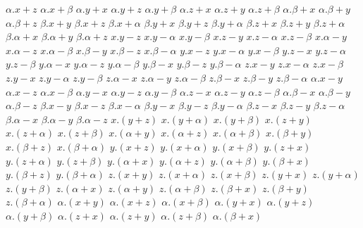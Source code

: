 $ \alpha . x + z $
$ \alpha . x + \beta $
$ \alpha . y + x $
$ \alpha . y + z $
$ \alpha . y + \beta $
$ \alpha . z + x $
$ \alpha . z + y $
$ \alpha . z + \beta $
$ \alpha . \beta + x $
$ \alpha . \beta + y $
$ \alpha . \beta + z $
$ \beta . x + y $
$ \beta . x + z $
$ \beta . x + \alpha $
$ \beta . y + x $
$ \beta . y + z $
$ \beta . y + \alpha $
$ \beta . z + x $
$ \beta . z + y $
$ \beta . z + \alpha $
$ \beta . \alpha + x $
$ \beta . \alpha + y $
$ \beta . \alpha + z $
$ x . y - z $
$ x . y - \alpha $
$ x . y - \beta $
$ x . z - y $
$ x . z - \alpha $
$ x . z - \beta $
$ x . \alpha - y $
$ x . \alpha - z $
$ x . \alpha - \beta $
$ x . \beta - y $
$ x . \beta - z $
$ x . \beta - \alpha $
$ y . x - z $
$ y . x - \alpha $
$ y . x - \beta $
$ y . z - x $
$ y . z - \alpha $
$ y . z - \beta $
$ y . \alpha - x $
$ y . \alpha - z $
$ y . \alpha - \beta $
$ y . \beta - x $
$ y . \beta - z $
$ y . \beta - \alpha $
$ z . x - y $
$ z . x - \alpha $
$ z . x - \beta $
$ z . y - x $
$ z . y - \alpha $
$ z . y - \beta $
$ z . \alpha - x $
$ z . \alpha - y $
$ z . \alpha - \beta $
$ z . \beta - x $
$ z . \beta - y $
$ z . \beta - \alpha $
$ \alpha . x - y $
$ \alpha . x - z $
$ \alpha . x - \beta $
$ \alpha . y - x $
$ \alpha . y - z $
$ \alpha . y - \beta $
$ \alpha . z - x $
$ \alpha . z - y $
$ \alpha . z - \beta $
$ \alpha . \beta - x $
$ \alpha . \beta - y $
$ \alpha . \beta - z $
$ \beta . x - y $
$ \beta . x - z $
$ \beta . x - \alpha $
$ \beta . y - x $
$ \beta . y - z $
$ \beta . y - \alpha $
$ \beta . z - x $
$ \beta . z - y $
$ \beta . z - \alpha $
$ \beta . \alpha - x $
$ \beta . \alpha - y $
$ \beta . \alpha - z $
$ x . (y + z) $
$ x . (y + \alpha) $
$ x . (y + \beta) $
$ x . (z + y) $
$ x . (z + \alpha) $
$ x . (z + \beta) $
$ x . (\alpha + y) $
$ x . (\alpha + z) $
$ x . (\alpha + \beta) $
$ x . (\beta + y) $
$ x . (\beta + z) $
$ x . (\beta + \alpha) $
$ y . (x + z) $
$ y . (x + \alpha) $
$ y . (x + \beta) $
$ y . (z + x) $
$ y . (z + \alpha) $
$ y . (z + \beta) $
$ y . (\alpha + x) $
$ y . (\alpha + z) $
$ y . (\alpha + \beta) $
$ y . (\beta + x) $
$ y . (\beta + z) $
$ y . (\beta + \alpha) $
$ z . (x + y) $
$ z . (x + \alpha) $
$ z . (x + \beta) $
$ z . (y + x) $
$ z . (y + \alpha) $
$ z . (y + \beta) $
$ z . (\alpha + x) $
$ z . (\alpha + y) $
$ z . (\alpha + \beta) $
$ z . (\beta + x) $
$ z . (\beta + y) $
$ z . (\beta + \alpha) $
$ \alpha . (x + y) $
$ \alpha . (x + z) $
$ \alpha . (x + \beta) $
$ \alpha . (y + x) $
$ \alpha . (y + z) $
$ \alpha . (y + \beta) $
$ \alpha . (z + x) $
$ \alpha . (z + y) $
$ \alpha . (z + \beta) $
$ \alpha . (\beta + x) $
